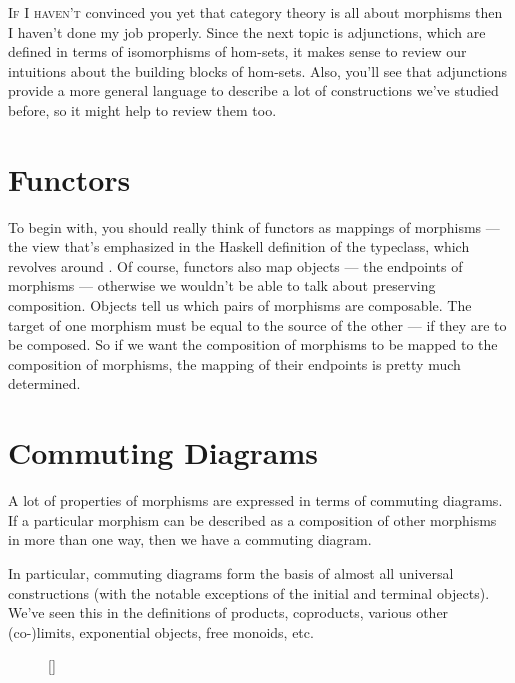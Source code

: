 \lettrine[lhang=0.17]{I}{f I haven't} convinced you yet that category theory is all about
morphisms then I haven't done my job properly. Since the next topic is
adjunctions, which are defined in terms of isomorphisms of hom-sets, it
makes sense to review our intuitions about the building blocks of
hom-sets. Also, you'll see that adjunctions provide a more general
language to describe a lot of constructions we've studied before, so it
might help to review them too.

\section{Functors}

To begin with, you should really think of functors as mappings of
morphisms --- the view that's emphasized in the Haskell definition of
the  typeclass, which revolves around . Of
course, functors also map objects --- the endpoints of morphisms ---
otherwise we wouldn't be able to talk about preserving composition.
Objects tell us which pairs of morphisms are composable. The target of
one morphism must be equal to the source of the other --- if they are to
be composed. So if we want the composition of morphisms to be mapped to
the composition of  morphisms, the mapping of their
endpoints is pretty much determined.

\section{Commuting Diagrams}

A lot of properties of morphisms are expressed in terms of commuting
diagrams. If a particular morphism can be described as a composition of
other morphisms in more than one way, then we have a commuting diagram.

In particular, commuting diagrams form the basis of almost all universal
constructions (with the notable exceptions of the initial and terminal
objects). We've seen this in the definitions of products, coproducts,
various other (co-)limits, exponential objects, free monoids, etc.

\begin{figure}
\raisebox{0pt}[\dimexpr{}\baselineskip\relax]{
}%
\end{figure}

